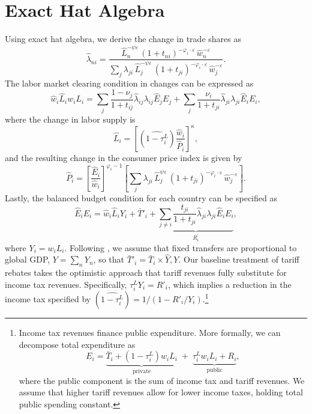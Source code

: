 \documentclass[12pt]{article}
\begin{document}
\section{Exact Hat Algebra}\label{exacthat_algebra}
Using exact hat algebra, we derive the change in trade shares as
\begin{equation}\label{eq: hat_algebra_1}
\hat{\lambda}_{ni}=\frac{\hat{L}_{n}^{-\psi\varepsilon}\,(1+t_{ni})^{-\varphi_i\cdot\varepsilon}\,\hat{w}_{n}^{-\varepsilon}}{\sum_{j}\lambda_{ji}\,\hat{L}_{j}^{-\psi\varepsilon}\,(1+t_{ji})^{-\varphi_i\cdot\varepsilon}\,\hat{w}_{j}^{-\varepsilon}}.
\end{equation}
The labor market clearing condition in changes can be expressed as\begin{equation}
\hat{w}_{i}\hat{L}_{i}w_{i}L_{i}=\sum_{j}\frac{1-\nu_{j}}{1+t_{ij}}\hat{\lambda}_{ij}\lambda_{ij}\hat{E}_{j}E_{j}+\sum_{j}\frac{\nu_{i}}{1+t_{ji}}\hat{\lambda}_{ji}\lambda_{ji}\hat{E}_{i}E_{i},
\end{equation}
    where  the change in labor supply is    \[   \hat{L}_{i}=\left[(\widehat{1-\tau_{i}^L})\frac{\hat{w}_{i}}{\hat{P}_{i}}\right]^{\kappa},    
    \]
and the resulting change in the consumer price index is given by\begin{equation}
\hat{P}_{i}=\left[\frac{\hat{E}_{i}}{\hat{w}_{i}}\right]^{\varphi_i-1}\left[\sum_{j}\lambda_{ji}\,\hat{L}_{j}^{\psi\varepsilon}\,(1+t_{ji})^{-\varphi_i\cdot\varepsilon}\,\hat{w}_{j}^{-\varepsilon}\right].
\end{equation}
Lastly, the balanced budget condition for each country can be specified as
\begin{equation}\label{eq: hat_algebra_2}
\hat{E}_{i}E_{i}=\hat{w}_{i}\hat{L}_{i}Y_{i} + \bar{T}'_i +  \underbrace{\sum_{j\neq i}\frac{t_{ji}}{1+t_{ji}}\hat{\lambda}_{ji}\lambda_{ji}\hat{E}_{i}E_{i}}_{R_{i}^{'}}, 
\end{equation}
where $Y_i=w_i L_i$.  Following \cite{DEK}, we assume that fixed transfers are proportional to global GDP, $Y = \sum_n Y_n$, so that $\bar{T}'_i = \bar{T}_i \times \hat{Y} , Y$. Our baseline treatment of tariff rebates takes the optimistic approach that tariff revenues fully substitute for income tax revenues. Specifically, $\tau_{i}^LY_{i}=R'_{i}$, which implies a reduction in the income tax specified by $(\widehat{1-\tau_{i}^L})=1/(1-R'_{i}/Y_{i})$.\footnote{Income tax revenues finance public expenditure. More formally, we can decompose total expenditure as  \[
E_{i}=\underbrace{\bar{T}_i + (1-\tau_{i}^L)w_{i}L_{i}}_{\text{private}}\; +\; \underbrace{\tau_{i}^Lw_{i}L_{i}+R_{i}}_{\text{public}},
\] where the public component is the sum of income tax and tariff revenues. We assume that higher tariff revenues allow for lower income taxes, holding total public spending constant.} 
\end{document}
